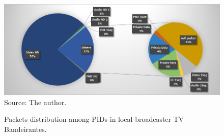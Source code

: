 \documentclass[
	12pt,				%
	openright,			%
	twoside,			%
	a4paper,			%
	brazil,
	french,				%
	english
	]{abntex2}
\begin{document}
\begin{figure}[!h]
\centering
\caption{Packets distribution among PIDs in local broadcaster TV Bandeirantes.}
\includegraphics[width=0.9\linewidth]{figuras/graph_band_dump.png}
\\Source: The author.
\label{fig:graph_band_dump}
\end{figure}
\end{document}
